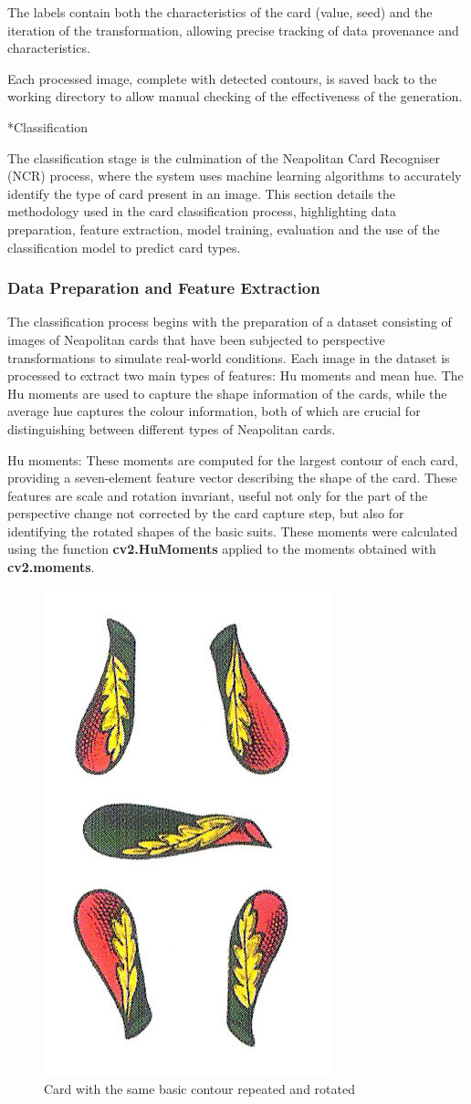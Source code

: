 \documentclass[twocolumn, a4paper,10pt]{article}
\makeatletter
\renewcommand\subsection{\@startsection{subsection}{1}{\z@}{\z@}{\z@}{\normalfont\normalsize\bfseries}}
\renewcommand\subsection{\@startsection{subsection}{1}{\z@}{\z@}{0.1pt}{\normalfont\normalsize\bfseries}}
\makeatother
\begin{document}
The labels contain both the characteristics of the card (value, seed) and the iteration of the transformation, allowing precise tracking of data provenance and characteristics.

Each processed image, complete with detected contours, is saved back to the working directory to allow manual checking of the effectiveness of the generation.

\subsection*{Classification}

The classification stage is the culmination of the Neapolitan Card Recogniser (NCR) process, where the system uses machine learning algorithms to accurately identify the type of card present in an image. This section details the methodology used in the card classification process, highlighting data preparation, feature extraction, model training, evaluation and the use of the classification model to predict card types.

\subsubsection*{Data Preparation and Feature Extraction}
The classification process begins with the preparation of a dataset consisting of images of Neapolitan cards that have been subjected to perspective transformations to simulate real-world conditions. Each image in the dataset is processed to extract two main types of features: Hu moments and mean hue. The Hu moments are used to capture the shape information of the cards, while the average hue captures the colour information, both of which are crucial for distinguishing between different types of Neapolitan cards.

Hu moments: These moments are computed for the largest contour of each card, providing a seven-element feature vector describing the shape of the card. These features are scale and rotation invariant, useful not only for the part of the perspective change not corrected by the card capture step, but also for identifying the rotated shapes of the basic suits.  These moments were calculated using the function \textbf{cv2.HuMoments} applied to the moments obtained with \textbf{cv2.moments}.

\begin{figure}[H]
  \centering
  \includegraphics[width=.23\textwidth]{img/5B.jpg}

  \caption*{Card with the same basic contour repeated and rotated}
\end{figure}
\end{document}
